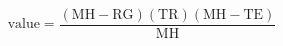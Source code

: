 \documentclass[12pt]{article}
\begin{document}
\noindent

\[
\text{value} = \frac{(\text{MH} - \text{RG})(\text{TR})(\text{MH} - \text{TE})}{\text{MH}}
\]
\end{document}
